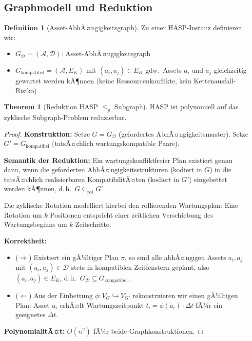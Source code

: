 ﻿\documentclass[a4paper,12pt]{article}
\theoremstyle{definition}
\newtheorem{definition}{Definition}[section]
\newtheorem{theorem}{Theorem}[section]
\begin{document}
\subsection{Graphmodell und Reduktion}

\begin{definition}[Asset-AbhÃ¤ngigkeitsgraph]
\label{def:aag}
Zu einer HASP-Instanz definieren wir:
\begin{itemize}
    \item $G_{\mathcal{D}} = (\mathcal{A}, \mathcal{D})$: Asset-AbhÃ¤ngigkeitsgraph
    \item $G_{\mathrm{kompatibel}} = (\mathcal{A}, E_K)$ mit $(a_i, a_j) \in E_K$ gdw.\
          Assets $a_i$ und $a_j$ gleichzeitig gewartet werden kÃ¶nnen
          (keine Ressourcenkonflikte, kein Kettenausfall-Risiko)
\end{itemize}
\end{definition}

\begin{theorem}[Reduktion HASP $\leq_p$ Subgraph]
\label{thm:hasp-red}
HASP ist polynomiell auf das zyklische Subgraph-Problem reduzierbar.
\end{theorem}

\begin{proof}
\textbf{Konstruktion:}
Setze $G = G_{\mathcal{D}}$ (gefordertes AbhÃ¤ngigkeitsmuster).
Setze $G' = G_{\mathrm{kompatibel}}$ (tatsÃ¤chlich wartungskompatible Paare).

\textbf{Semantik der Reduktion:}
Ein wartungskonfliktfreier Plan existiert genau dann, wenn die geforderten
AbhÃ¤ngigkeitsstrukturen (kodiert in $G$) in die tatsÃ¤chlich realisierbaren
KompatibilitÃ¤ten (kodiert in $G'$) eingebettet werden kÃ¶nnen, d.\,h.\ $G \subseteq_{\mathrm{rot}} G'$.

Die zyklische Rotation modelliert hierbei den rollierenden Wartungsplan:
Eine Rotation um $k$ Positionen entspricht einer zeitlichen Verschiebung des
Wartungsbeginns um $k$ Zeitschritte.

\textbf{Korrektheit:}
\begin{itemize}
    \item ($\Rightarrow$) Existiert ein gÃ¼ltiger Plan $\pi$, so sind alle
          abhÃ¤ngigen Assets $a_i, a_j$ mit $(a_i, a_j) \in \mathcal{D}$ stets in
          kompatiblen Zeitfenstern geplant, also $(a_i, a_j) \in E_K$,
          d.\,h.\ $G_{\mathcal{D}} \subseteq G_{\mathrm{kompatibel}}$.
    \item ($\Leftarrow$) Aus der Einbettung $\phi: V_G \hookrightarrow V_{G'}$
          rekonstruieren wir einen gÃ¼ltigen Plan: Asset $a_i$ erhÃ¤lt Wartungszeitpunkt
          $t_i = \phi(a_i) \cdot \Delta t$ fÃ¼r ein geeignetes $\Delta t$.
\end{itemize}

\textbf{PolynomialitÃ¤t:} $O(n^2)$ fÃ¼r beide Graphkonstruktionen.
\end{proof}
\end{document}
